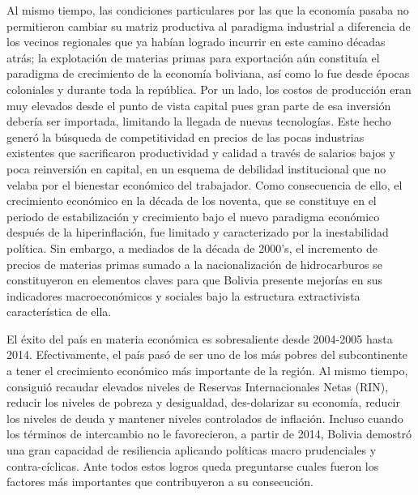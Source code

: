 \documentclass[12pt,letterpaper]{article}
\begin{document}
Al mismo tiempo, las condiciones particulares por las que la economía pasaba no permitieron cambiar su matriz productiva al paradigma industrial a diferencia de los vecinos regionales que ya habían logrado incurrir en este camino décadas atrás; la explotación de materias primas para exportación aún constituía el paradigma de crecimiento de la economía boliviana, así como lo fue desde épocas coloniales y durante toda la república. Por un lado, los costos de producción eran muy elevados desde el punto de vista capital pues gran parte de esa inversión debería ser importada, limitando la llegada de nuevas tecnologías. Este hecho generó la búsqueda de competitividad en precios de las  pocas industrias existentes que sacrificaron productividad y calidad a través de salarios bajos y poca reinversión en capital, en un esquema de debilidad institucional que no velaba por el bienestar económico del trabajador. Como consecuencia de ello, el crecimiento económico en la década de los noventa, que se constituye en el periodo de estabilización y crecimiento bajo el nuevo paradigma económico después de la hiperinflación, fue limitado y caracterizado por la inestabilidad política. Sin embargo, a mediados de la década de 2000's, el incremento de precios de materias primas sumado a la nacionalización de hidrocarburos se constituyeron en elementos claves para que Bolivia presente mejorías en sus indicadores macroeconómicos y sociales bajo la estructura extractivista característica de ella.

El éxito del país en materia económica es sobresaliente desde 2004-2005 hasta 2014. Efectivamente, el país pasó de ser uno de los más pobres del subcontinente a tener el crecimiento económico más importante de la región. Al mismo tiempo, consiguió recaudar elevados niveles de Reservas Internacionales Netas (RIN), reducir los niveles de pobreza y desigualdad, des-dolarizar su economía, reducir los niveles de deuda y mantener niveles controlados de inflación. Incluso cuando los términos de intercambio no le favorecieron, a partir de 2014, Bolivia demostró una gran capacidad de resiliencia aplicando políticas macro prudenciales y contra-cíclicas. Ante todos estos logros queda preguntarse cuales fueron los factores más importantes que contribuyeron a su consecución.
\end{document}
